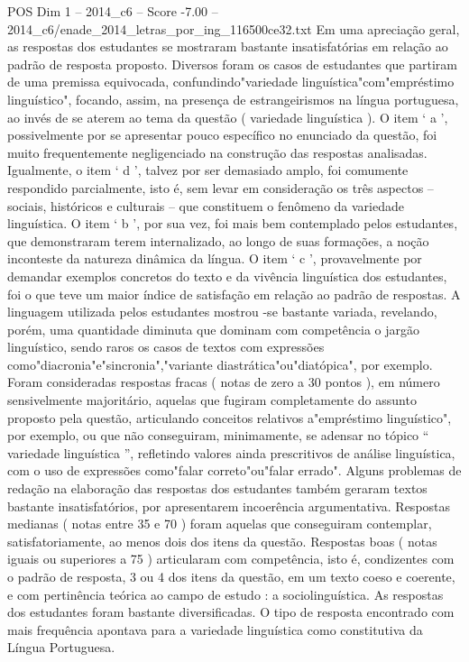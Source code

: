 \begin{textsample}{POS Dim 1 – 2014\_c6 – Score -7.00 – 2014\_c6/enade\_2014\_letras\_por\_ing\_116500ce32.txt}
Em uma apreciação geral, as respostas dos estudantes se mostraram bastante insatisfatórias em relação ao padrão de resposta proposto.
Diversos foram os casos de estudantes que partiram de uma premissa equivocada, confundindo"variedade linguística"com"empréstimo linguístico", focando, assim, na presença de estrangeirismos na língua portuguesa, ao invés de se aterem ao tema da questão ( variedade linguística ).
O item ‘ a ’, possivelmente por se apresentar pouco específico no enunciado da questão, foi muito frequentemente negligenciado na construção das respostas analisadas.
Igualmente, o item ‘ d ’, talvez por ser demasiado amplo, foi comumente respondido parcialmente, isto é, sem levar em consideração os três aspectos – sociais, históricos e culturais – que constituem o fenômeno da variedade linguística.
O item ‘ b ’, por sua vez, foi mais bem contemplado pelos estudantes, que demonstraram terem internalizado, ao longo de suas formações, a noção inconteste da natureza dinâmica da língua.
O item ‘ c ’, provavelmente por demandar exemplos concretos do texto e da vivência linguística dos estudantes, foi o que teve um maior índice de satisfação em relação ao padrão de respostas.
A linguagem utilizada pelos estudantes mostrou -se bastante variada, revelando, porém, uma quantidade diminuta que dominam com competência o jargão linguístico, sendo raros os casos de textos com expressões como"diacronia"e"sincronia","variante diastrática"ou"diatópica", por exemplo.
Foram consideradas respostas fracas ( notas de zero a 30 pontos ), em número sensivelmente majoritário, aquelas que fugiram completamente do assunto proposto pela questão, articulando conceitos relativos a"empréstimo linguístico", por exemplo, ou que não conseguiram, minimamente, se adensar no tópico “ variedade linguística ”, refletindo valores ainda prescritivos de análise linguística, com o uso de expressões como"falar correto"ou"falar errado".
Alguns problemas de redação na elaboração das respostas dos estudantes também geraram textos bastante insatisfatórios, por apresentarem incoerência argumentativa.
Respostas medianas ( notas entre 35 e 70 ) foram aquelas que conseguiram contemplar, satisfatoriamente, ao menos dois dos itens da questão.
Respostas boas ( notas iguais ou superiores a 75 ) articularam com competência, isto é, condizentes com o padrão de resposta, 3 ou 4 dos itens da questão, em um texto coeso e coerente, e com pertinência teórica ao campo de estudo : a sociolinguística.
As respostas dos estudantes foram bastante diversificadas.
O tipo de resposta encontrado com mais frequência apontava para a variedade linguística como constitutiva da Língua Portuguesa.

\end{textsample}
